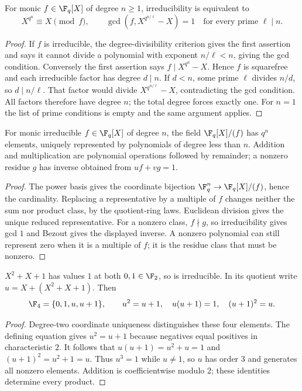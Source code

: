 \begin{theorem}
For monic $f\in\F_q[X]$ of degree $n\geq1$, irreducibility is equivalent to
\[X^{q^n}\equiv X\pmod f,\qquad
\gcd(f,X^{q^{n/\ell}}-X)=1\quad\text{for every prime }\ell\mid n.
\]
\end{theorem}
\begin{proof}
If $f$ is irreducible, the degree-divisibility criterion gives the first assertion and says it cannot divide a polynomial with exponent $n/\ell<n$, giving the gcd condition. Conversely the first assertion says $f\mid X^{q^n}-X$. Hence $f$ is squarefree and each irreducible factor has degree $d\mid n$. If $d<n$, some prime $\ell$ divides $n/d$, so $d\mid n/\ell$. That factor would divide $X^{q^{n/\ell}}-X$, contradicting the gcd condition. All factors therefore have degree $n$; the total degree forces exactly one. For $n=1$ the list of prime conditions is empty and the same argument applies.
\end{proof}

\begin{theorem}
For monic irreducible $f\in\F_q[X]$ of degree $n$, the field $\F_q[X]/(f)$ has $q^n$ elements, uniquely represented by polynomials of degree less than $n$. Addition and multiplication are polynomial operations followed by remainder; a nonzero residue $g$ has inverse obtained from $uf+vg=1$.
\end{theorem}
\begin{proof}
The power basis gives the coordinate bijection $\F_q^n\to\F_q[X]/(f)$, hence the cardinality. Replacing a representative by a multiple of $f$ changes neither the sum nor product class, by the quotient-ring laws. Euclidean division gives the unique reduced representative. For a nonzero class, $f\nmid g$, so irreducibility gives gcd $1$ and Bezout gives the displayed inverse. A nonzero polynomial can still represent zero when it is a multiple of $f$; it is the residue class that must be nonzero.
\end{proof}

\begin{example}
$X^2+X+1$ has values $1$ at both $0,1\in\F_2$, so is irreducible. In its quotient write $u=X+(X^2+X+1)$. Then
\[\F_4=\{0,1,u,u+1\},\qquad u^2=u+1,\quad u(u+1)=1,\quad (u+1)^2=u.
\]
\end{example}
\begin{proof}
Degree-two coordinate uniqueness distinguishes these four elements. The defining equation gives $u^2=u+1$ because negatives equal positives in characteristic $2$. It follows that $u(u+1)=u^2+u=1$ and $(u+1)^2=u^2+1=u$. Thus $u^3=1$ while $u\ne1$, so $u$ has order $3$ and generates all nonzero elements. Addition is coefficientwise modulo $2$; these identities determine every product.
\end{proof}


